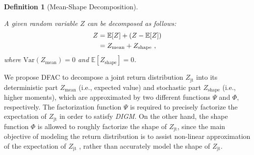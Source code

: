 \documentclass{article}
\newcommand{\utility}{Z}
\newcommand{\joint}{\mathrm{jt}}
\newcommand{\meandecompositionfunction}{\Psi}
\newcommand{\shapedecompositionfunction}{\Phi}
\newcommand{\digm}{\textit{DIGM}}
\newcounter{definition}
\newtheorem{definition}[definition]{Definition}
\begin{document}
\begin{definition}[Mean-Shape Decomposition]
\label{def:mean_shape_decomposition}

A given random variable $Z$ can be decomposed as follows:
\begin{equation}
\begin{split}
Z &= \mathbb{E}[Z]+(Z-\mathbb{E}[Z]) \\
&= Z_{\mathrm{mean}}+Z_{\mathrm{shape}}\ ,
\end{split}
\notag{}
\end{equation}
where $\mathrm{Var}(Z_{\mathrm{mean}})=0$ and $\mathbb{E}[Z_{\mathrm{shape}}]=0$.

\end{definition} 
We propose DFAC to decompose a joint return distribution $\utility{}_{\joint{}}$ into its deterministic part $\utility{}_{\text{mean}}$ (i.e., expected value) and stochastic part $\utility{}_{\text{shape}}$ (i.e., higher moments), which are approximated by two different functions $\meandecompositionfunction$ and $\shapedecompositionfunction$, respectively. The factorization function $\meandecompositionfunction$ is required to precisely factorize the expectation of $\utility{}_{\joint{}}$ in order to satisfy \digm{}. On the other hand, the shape function $\shapedecompositionfunction$ is allowed to roughly factorize the shape of $\utility{}_{\joint{}}$, since the main objective of modeling the return distribution is to assist non-linear approximation of the expectation of $\utility{}_{\joint{}}$ \cite{Lyle2019Comparative}, rather than accurately model the shape of $\utility{}_{\joint{}}$.
\end{document}
